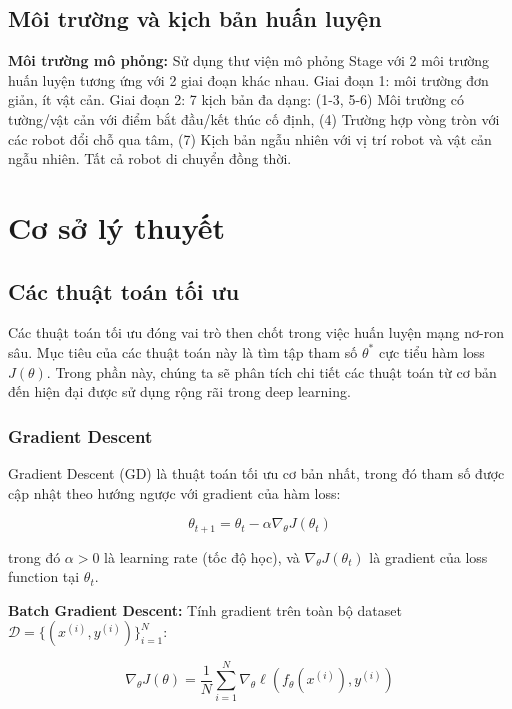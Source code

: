 \subsection{Môi trường và kịch bản huấn luyện}
\label{subsec:long_environment}

\textbf{Môi trường mô phỏng:} Sử dụng thư viện mô phỏng Stage với 2 môi trường huấn luyện tương ứng với 2 giai đoạn khác nhau. Giai đoạn 1: môi trường đơn giản, ít vật cản. Giai đoạn 2: 7 kịch bản đa dạng: (1-3, 5-6) Môi trường có tường/vật cản với điểm bắt đầu/kết thúc cố định, (4) Trường hợp vòng tròn với các robot đổi chỗ qua tâm, (7) Kịch bản ngẫu nhiên với vị trí robot và vật cản ngẫu nhiên. Tất cả robot di chuyển đồng thời.

\section{Cơ sở lý thuyết}
\label{sec:theory}

\subsection{Các thuật toán tối ưu}
\label{subsec:optimization_algorithms}

Các thuật toán tối ưu đóng vai trò then chốt trong việc huấn luyện mạng nơ-ron sâu. Mục tiêu của các thuật toán này là tìm tập tham số $\theta^*$ cực tiểu hàm loss $J(\theta)$. Trong phần này, chúng ta sẽ phân tích chi tiết các thuật toán từ cơ bản đến hiện đại được sử dụng rộng rãi trong deep learning.

\subsubsection{Gradient Descent}

Gradient Descent (GD) là thuật toán tối ưu cơ bản nhất, trong đó tham số được cập nhật theo hướng ngược với gradient của hàm loss:

\begin{equation}
\theta_{t+1} = \theta_t - \alpha \nabla_\theta J(\theta_t)
\end{equation}

trong đó $\alpha > 0$ là learning rate (tốc độ học), và $\nabla_\theta J(\theta_t)$ là gradient của loss function tại $\theta_t$.

\textbf{Batch Gradient Descent:} Tính gradient trên toàn bộ dataset $\mathcal{D} = \{(x^{(i)}, y^{(i)})\}_{i=1}^N$:

\begin{equation}
\nabla_\theta J(\theta) = \frac{1}{N} \sum_{i=1}^N \nabla_\theta \ell(f_\theta(x^{(i)}), y^{(i)})
\end{equation}

